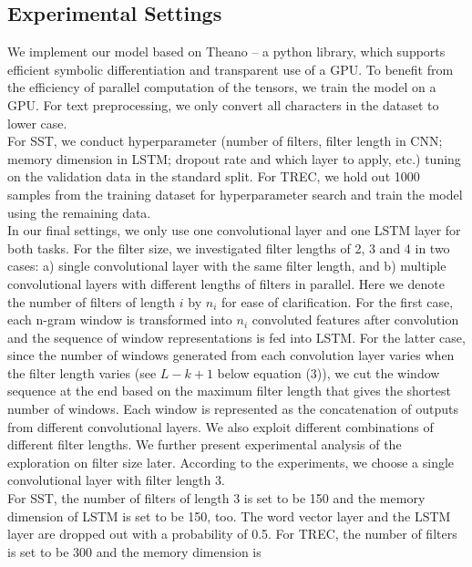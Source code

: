 \documentclass[11pt,letterpaper]{article}
\begin{document}
\subsection{Experimental Settings}
We implement our model based on Theano \cite{theano} -- a python library, which supports efficient symbolic differentiation and transparent use of a GPU. %
To benefit from the efficiency of parallel computation of the tensors, we train the model on
a GPU. For text preprocessing, we only convert all characters in the
dataset to lower case.\\
\indent For SST, we conduct hyperparameter (number of filters, filter
length in CNN; memory dimension in LSTM; dropout rate and which layer to
apply, etc.) tuning on the validation data in the standard split. For
TREC, we hold out 1000 samples from the training dataset for
hyperparameter search and train the model using the remaining data.\\
\indent In our final settings, we only use one convolutional layer and
one LSTM layer for both tasks. For the filter size, we investigated
filter lengths of 2, 3 and 4 in two cases: a) single convolutional layer
with the same filter length, and b) multiple convolutional layers with
different lengths of filters in parallel. Here we denote the number of
filters of length $i$ by $n_i$ for ease of clarification. For the first
case, each n-gram window is transformed into $n_i$ convoluted features
after convolution and the sequence of window representations is fed into
LSTM. For the latter case, since the number of windows generated from
each convolution layer varies when the filter length varies (see $L-k+1$
below equation (3)), we cut the window sequence at the end based on the
maximum filter length that gives the shortest number of windows. Each
window is represented as the concatenation of outputs from different
convolutional layers. We also exploit different combinations of
different filter lengths. We further present experimental analysis of
the exploration on filter size later. According to the experiments, we
choose a single convolutional layer with filter length 3.\\
\indent For SST, the number of filters of length 3 is set to be 150 and
the memory dimension of LSTM is set to be 150, too. The word vector
layer and the LSTM layer are dropped out with a probability of 0.5. For
TREC, the number of filters is set to be 300 and the memory dimension is
\end{document}
